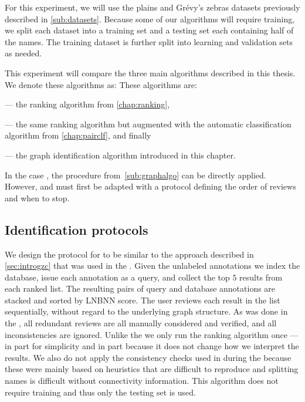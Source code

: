     For this experiment, we will use the plains and Grévy's zebras datasets previously described in
      \cref{sub:datasets}.
    Because some of our algorithms will require training, we split each dataset into a training set and a testing
      set each containing half of the names.
    The training dataset is further split into learning and validation sets as needed.

    This experiment will compare the three main algorithms described in this thesis.
    We denote these algorithms as:
    These algorithms are:
    \begin{enumin}
    \item {} --- the ranking algorithm from \cref{chap:ranking},
    \item {} --- the same ranking algorithm but augmented with the automatic classification algorithm from \cref{chap:pairclf}, and finally
    \item {} --- the graph identification algorithm introduced in this chapter.
    \end{enumin}
    In the case , the procedure from~\cref{sub:graphalgo} can be directly applied.
    However,  and  must first be adapted with a protocol defining the order of
      reviews and when to stop.

    \subsection{Identification protocols}

    We design the protocol for  to be similar to the approach described in \cref{sec:introgzc} that
      was used in the \GZC{}.
    Given the unlabeled annotations we index the database, issue each annotation as a query, and collect the top
      $5$ results from each ranked list.
    The resulting pairs of query and database annotations are stacked and sorted by LNBNN score.
    The user reviews each result in the list sequentially, without regard to the underlying graph structure.
    As was done in the \GZC{}, all redundant reviews are all manually considered and verified, and all
      inconsistencies are ignored.
    Unlike the \GZC{} we only run the ranking algorithm once --- in part for simplicity and in part because it
      does not change how we interpret the results.
    We also do not apply the consistency checks used in during the \GZC{} because these were mainly based on
      heuristics that are difficult to reproduce and splitting names is difficult without connectivity information.
    This algorithm does not require training and thus only the testing set is used.

